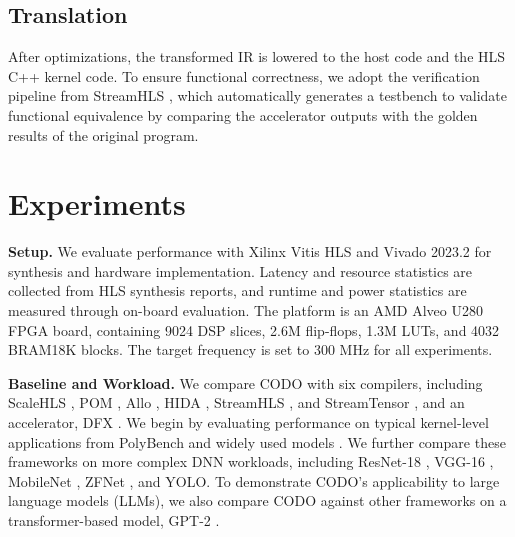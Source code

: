 \documentclass[conference]{IEEEtran}
\begin{document}
\subsection{Translation}
After optimizations, the transformed IR is lowered to the host code and the HLS C++ kernel code. To ensure functional correctness, we adopt the verification pipeline from StreamHLS \cite{streamhlsFPGA25}, which automatically generates a testbench to validate functional equivalence by comparing the accelerator outputs with the golden results of the original program.




\section{Experiments}
\textbf{Setup.} We evaluate performance with Xilinx Vitis HLS and Vivado 2023.2 for synthesis and hardware implementation. Latency and resource statistics are collected from HLS synthesis reports, and runtime and power statistics are measured through on-board evaluation.
The platform is an AMD Alveo U280 FPGA board, containing 9024 DSP slices, 2.6M flip-flops, 1.3M LUTs, and 4032 BRAM18K blocks. The target frequency is set to 300 MHz for all experiments.

\textbf{Baseline and Workload.} We compare CODO with six compilers, including ScaleHLS \cite{ye2022scalehls}, POM \cite{zhang2024pom}, Allo \cite{chen2024allo}, HIDA \cite{ye2024hida}, StreamHLS \cite{streamhlsFPGA25}, and StreamTensor \cite{streamtensorMICRO25}, and an accelerator, DFX \cite{dfxmicro2022}.
We begin by evaluating performance on typical kernel-level applications from PolyBench and widely used models \cite{encoder2010,he2016deep,howard2017MobileNets,vaswani2017attention}.
We further compare these frameworks on more complex DNN workloads, including ResNet-18 \cite{he2016deep}, VGG-16 \cite{simonyan2014very}, MobileNet \cite{howard2017MobileNets}, ZFNet \cite{zeiler2014visualizing}, and YOLO\cite{YOLO}. To demonstrate CODO's applicability to large language models (LLMs), we also compare CODO against other frameworks on a transformer-based model, GPT-2 \cite{Radford2019LanguageMA}.
\end{document}
